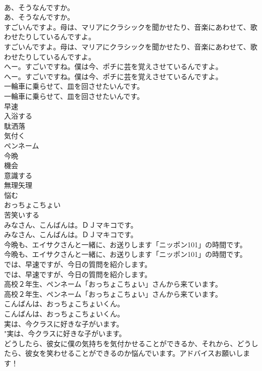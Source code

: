 \documentclass[8pt]{extreport}
\begin{document}
\begin{CJK}{UTF8}{min}
\\	あ、そうなんですか。	
\\	あ、そうなんですか。 
\\	すごいんですよ。母は、マリアにクラシックを聞かせたり、音楽にあわせて、歌わせたりしているんですよ。	
\\	すごいんですよ。母は、マリアにクラシックを聞かせたり、音楽にあわせて、歌わせたりしているんですよ。 
\\	へー。すごいですね。僕は今、ポチに芸を覚えさせているんですよ。	
\\	へー。すごいですね。僕は今、ポチに芸を覚えさせているんですよ。 
\\	一輪車に乗らせて、皿を回させたいんです。	
\\	一輪車に乗らせて、皿を回させたいんです。 
\\	早速
\\	入浴する
\\	駄洒落
\\	気付く
\\	ペンネーム
\\	今晩
\\	機会
\\	意識する
\\	無理矢理
\\	悩む
\\	おっちょこちょい
\\	苦笑いする
\\	みなさん、こんばんは。ＤＪマキコです。	
\\	みなさん、こんばんは。ＤＪマキコです。 
\\	今晩も、エイサクさんと一緒に、お送りします「ニッポン101」の時間です。	
\\	今晩も、エイサクさんと一緒に、お送りします「ニッポン101」の時間です。 
\\	では、早速ですが、今日の質問を紹介します。	
\\	では、早速ですが、今日の質問を紹介します。 
\\	高校２年生、ペンネーム「おっちょこちょい」さんから来ています。	
\\	高校２年生、ペンネーム「おっちょこちょい」さんから来ています。 
\\	こんばんは、おっちょこちょいくん。	
\\	こんばんは、おっちょこちょいくん。 
\\	実は、今クラスに好きな子がいます。	
\\	"実は、今クラスに好きな子がいます。 
\\	どうしたら、彼女に僕の気持ちを気付かせることができるか、それから、どうしたら、彼女を笑わせることができるのか悩んでいます。アドバイスお願いします！	

\end{CJK}
\end{document}
